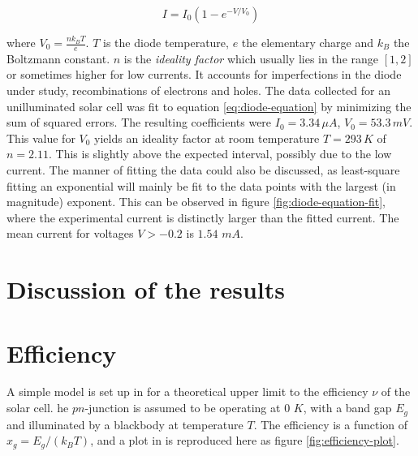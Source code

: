 \documentclass[a4paper,twoside=false,abstract=false,numbers=noenddot,
titlepage=false,headings=small,parskip=half,version=last]{scrartcl}
\begin{document}
\begin{equation}
    I = I_0 \left( 1 - e^{-V/V_0}\right)\label{eq:diode-equation}
\end{equation}

where $V_0 = \frac{nk_BT}{e}$.
$T$ is the diode temperature, $e$ the elementary charge and $k_B$ the Boltzmann constant.
$n$ is the \emph{ideality factor} which usually lies in the range $[1,2]$ or sometimes higher for low currents.
It accounts for imperfections in the diode under study, recombinations of electrons and holes.
The data collected for an unilluminated solar cell was fit to equation \eqref{eq:diode-equation} by minimizing the sum of squared errors.
The resulting coefficients were $I_0=3.34\,\mu A$, $V_0=53.3\, mV$.
This value for $V_0$ yields an ideality factor at room temperature $T=293\,K$ of $n = 2.11$.
This is slightly above the expected interval, possibly due to the low current.
The manner of fitting the data could also be discussed, as least-square fitting an exponential will mainly be fit to the data points with the largest (in magnitude) exponent.
This can be observed in figure \ref{fig:diode-equation-fit}, where the experimental current is distinctly larger than the fitted current.
The mean current for voltages $V>-0.2$ is $1.54$ $mA$.
\section{Discussion of the results}


\section{Efficiency}
A simple model is set up in \cite{lab-instruction} for a theoretical upper limit to the efficiency $\nu$ of the solar cell.
he $pn$-junction is assumed to be operating at $0$ $K$, with a band gap $E_g$ and illuminated by a blackbody at temperature $T$.
The efficiency is a function of $x_g=E_g/(k_BT)$, and a plot in \cite{lab-instruction} is reproduced here as figure \ref{fig:efficiency-plot}.
\end{document}
